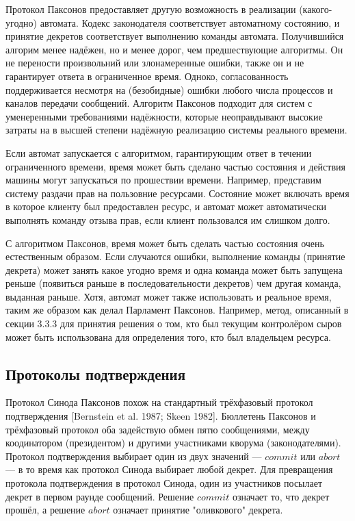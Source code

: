 \documentclass[12pt, a4paper]{article} %
\begin{document}
Протокол Паксонов предоставляет другую возможность в реализации (какого-угодно) автомата. Кодекс законодателя соответствует автоматному состоянию, и принятие декретов соответствует выполнению команды автомата. Получившийся алгорим менее надёжен, но и менее дорог, чем предшествующие алгоритмы. Он не перености произвольний или злонамеренные ошибки, также он и не гарантирует ответа в ограниченное время. Одноко, согласованность поддерживается несмотря на (безобидные) ошибки любого числа процессов и каналов передачи сообщений. Алгоритм Паксонов подходит для систем с уменеренными требованиями надёжности, которые неоправдывают высокие затраты на в высшей степени надёжную реализацию системы реального времени.

Если автомат запускается с алгоритмом, гарантирующим ответ в течении ограниченного времени, время может быть сделано частью состояния и действия машины могут запускаться по прошествии времени. Например, представим систему раздачи прав на пользовние ресурсами. Состояние может включать время в которое клиенту был предоставлен ресурс, и автомат может автоматически выполнять команду отзыва прав, если клиент пользовался им слишком долго.

С алгоритмом Паксонов, время может быть сделать частью состояния очень естественным образом. Если случаются ошибки, выполнение команды (принятие декрета) может занять какое угодно время и одна команда может быть запущена реньше (появиться раньше в последовательности декретов) чем другая команда, выданная раньше. Хотя, автомат может также использовать и реальное время, таким же образом как делал Парламент Паксонов. Например, метод, описанный в секции 3.3.3 для принятия решения о том, кто  был текущим контролёром сыров может быть использована для определения того, кто был владельцем ресурса.

\subsection{Протоколы подтверждения}

Протокол Синода Паксонов похож на стандартный трёхфазовый протокол подтверждения [Bernstein et al. 1987; Skeen 1982]. Бюллетень Паксонов и трёхфазовый протокол оба задействую обмен пятю сообщениями, между коодинатором (президентом) и другими участниками кворума (законодателями). Протокол подтверждения выбирает один из двух значений --- $commit$ или $abort$ --- в то время как протокол Синода выбирает любой декрет. Для превращения протокола подтверждения в протокол Синода, один из участников посылает декрет в первом раунде сообщений. Решение $commit$ означает то, что декрет прошёл, а решение $abort$ означает принятие "оливкового" декрета.
\end{document}
